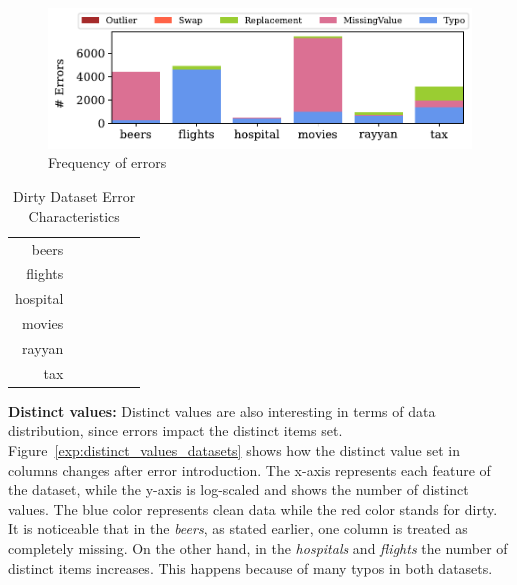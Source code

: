 \begin{figure}[!t]
    \centering
    \includegraphics[width=\textwidth]{figures/plot/error_percent/errors.pdf}
    \caption{Frequency of errors}
    \label{exp:errors_count}
\end{figure}

\begin{table}[!t]
\centering
\caption{\label{tab:dirty_num_errors}Dirty Dataset Error Characteristics}
\begin{tabular}{r|K|K|K|K|K}
\toprule
                     &  &  &              &               &    \\ \midrule
beers                &         &    &            &                 &        \\
flights              &         &   &               &               &        \\
hospital             &         &    &              &                 &        \\
movies               &         &   &            &               &        \\
rayyan               &         &    &              &               &        \\
tax                  &         &   &             &              &        \\ \bottomrule
\end{tabular}
\end{table}

\textbf{Distinct values:} 
Distinct values are also interesting in terms of data distribution, since errors impact the distinct items set.
Figure~\ref{exp:distinct_values_datasets} shows how the distinct value set in columns changes after error introduction. 
The x-axis represents each feature of the dataset, while the y-axis is log-scaled and shows the number of distinct values. 
The blue color represents clean data while the red color stands for dirty.
It is noticeable that in the \textit{beers}, as stated earlier, one column is treated as completely missing.
On the other hand, in the \textit{hospitals} and \textit{flights} the number of distinct items increases.
This happens because of many typos in both datasets.

